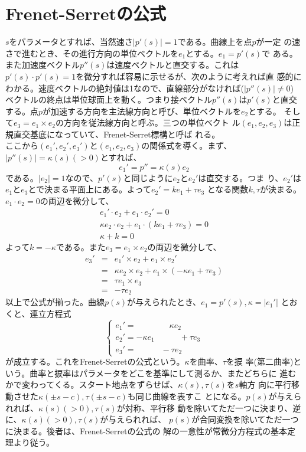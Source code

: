     \section{Frenet-Serretの公式}
        $s$をパラメータとすれば、当然速さ$|p'(s)| = 1$である。曲線上を点$p$が一定
        の速さで進むとき、その進行方向の単位ベクトルを$e_1$とする。$e_1 = p'(s)$で
        ある。また加速度ベクトル$p''(s)$は速度ベクトルと直交する。これは
        $p'(s)\cdot p'(s) = 1$を微分すれば容易に示せるが、次のように考えれば直
        感的にわかる。速度ベクトルの絶対値は1なので、直線部分がなければ($|p''(s)|\neq 0$)
        ベクトルの終点は単位球面上を動く。つまり接ベクトル$p''(s)$は$p'(s)$と直交
        する。点$p$が加速する方向を主法線方向と呼び、単位ベクトルを$e_2$とする。
        そして$e_3 = e_1\times e_2$の方向を従法線方向と呼ぶ。三つの単位ベクト
        ル$(e_1,e_2,e_3)$は正規直交基底になっていて、Frenet-Serret標構と呼ば
        れる。\\
        ここから$(e_1',e_2',e_3')$と$(e_1,e_2,e_3)$の関係式を導く。まず、
        $|p''(s)|=\kappa(s)(>0)$とすれば、
            \[e_1' = p'' = \kappa(s) e_2\]
        である。$|e_2|=1$なので、$p'(s)$と同じように$e_2$と$e_2'$は直交する。つま
        り、$e_2'$は$e_1$と$e_3$とで決まる平面上にある。よって$e_2' = ke_1+\tau e_3$
        となる関数$k,\tau$が決まる。$e_1\cdot e_2 = 0$の両辺を微分して、
        \begin{eqnarray*}
            e_1'\cdot e_2+e_1\cdot e_2' = 0\\
            \kappa e_2\cdot e_2+e_1\cdot (ke_1+\tau e_3) = 0\\
            \kappa +k = 0
        \end{eqnarray*}
        よって$k = -\kappa$である。また$e_3 = e_1\times e_2$の両辺を微分して、
        \begin{eqnarray*}
            e_3' &=& e_1'\times e_2+e_1\times e_2'\\
            &=& \kappa e_2\times e_2+e_1\times (-\kappa e_1+\tau e_3)\\
            &=& \tau e_1\times e_3\\
            &=& -\tau e_2
        \end{eqnarray*}
        以上で公式が揃った。曲線$p(s)$が与えられたとき、$e_1 = p'(s),\kappa = |e_1'|$
        とおくと、連立方程式
        \[
            \begin{cases}
                e_1' = \qquad\qquad \kappa e_2\\
                e_2' = -\kappa e_1\quad\qquad +\tau e_3\\
                e_3' = \quad\qquad -\tau e_2
            \end{cases}
        \]
        が成立する。これをFrenet-Serretの公式という。$\kappa$を曲率、$\tau$を捩
        率(第二曲率)という。曲率と捩率はパラメータをどこを基準にして測るか、またどちらに
        進むかで変わってくる。スタート地点をずらせば、$\kappa(s),\tau(s)$を$s$軸方
        向に平行移動させた$\kappa(\pm s-c),\tau(\pm s-c)$も同じ曲線を表すこ
        とになる。$p(s)$が与えられれば、$\kappa(s)(>0),\tau(s)$が対称、平行移
        動を除いてただ一つに決まり、逆に、$\kappa(s)(>0),\tau(s)$が与えられれば、
        $p(s)$が合同変換を除いてただ一つに決まる。後者は、Frenet-Serretの公式の
        解の一意性が常微分方程式の基本定理より従う。